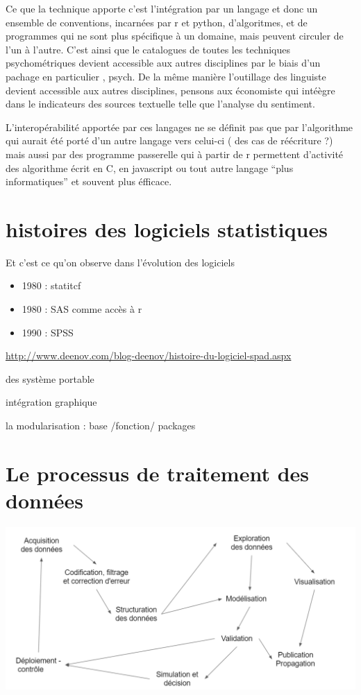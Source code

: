\documentclass[
]{book}
\providecommand{\tightlist}{%
  \setlength{\itemsep}{0pt}\setlength{\parskip}{0pt}}
\begin{document}
Ce que la technique apporte c'est l'intégration par un langage et donc un ensemble de conventions, incarnées par r et python, d'algoritmes, et de programmes qui ne sont plus spécifique à un domaine, mais peuvent circuler de l'un à l'autre. C'est ainsi que le catalogues de toutes les techniques psychométriques devient accessible aux autres disciplines par le biais d'un pachage en particulier , psych. De la même manière l'outillage des linguiste devient accessible aux autres disciplines, pensons aux économiste qui intéègre dans le indicateurs des sources textuelle telle que l'analyse du sentiment.

L'interopérabilité apportée par ces langages ne se définit pas que par l'algorithme qui aurait été porté d'un autre langage vers celui-ci ( des cas de réécriture ?) mais aussi par des programme passerelle qui à partir de r permettent d'activité des algorithme écrit en C, en javascript ou tout autre langage ``plus informatiques'' et souvent plus éfficace.

\hypertarget{histoires-des-logiciels-statistiques}{%
\section{histoires des logiciels statistiques}\label{histoires-des-logiciels-statistiques}}

Et c'est ce qu'on observe dans l'évolution des logiciels

\begin{itemize}
\tightlist
\item
  1980 : statitcf
\item
  1980 : SAS comme accès à r
\item
  1990 : SPSS
\end{itemize}

\url{http://www.deenov.com/blog-deenov/histoire-du-logiciel-spad.aspx}

des système portable

intégration graphique

la modularisation : base /fonction/ packages

\hypertarget{le-processus-de-traitement-des-donnuxe9es}{%
\section{Le processus de traitement des données}\label{le-processus-de-traitement-des-donnuxe9es}}

\includegraphics{./Images/datascience2.png}
\end{document}
